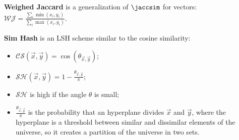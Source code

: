 \ex \textbf{Weighed Jaccard} is a generalization of $\jaccsim$ for vectors: \\ $\mathcal{WJ}=\frac
    {\sum_i \min(x_i, y_i)}{\sum_i \max(x_i, y_i)}$.

\ex \textbf{Sim Hash} is an LSH scheme similar to the cosine similarity:
\begin{itemize}
    \item $\mathcal{CS}(\vec{x},\vec{y})=
        \cos(\theta_{\vec{x},\vec{y}}) $;
    \item $\mathcal{SH}(\vec{x},\vec{y})=
        1-\frac{\theta_{\vec{x},\vec{y}}}{\pi} $;
    \item $\mathcal{SH}$ is high if the angle $\theta$ is small;
    \item $\frac{\theta_{\vec{x},\vec{y}}}{\pi}$ is the probability that an hyperplane divides $\vec{x}$ and $\vec{y}$, where the hyperplane is a threshold between similar and dissimilar elements of the universe, so it creates a partition of the universe in two sets.
\end{itemize}
